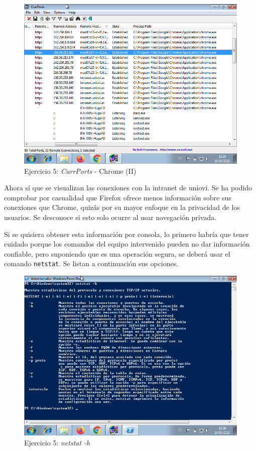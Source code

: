 \documentclass[11pt]{article}
\begin{document}
\begin{figure}[H]
    \caption{Ejercicio 5: \textit{CurrPorts} - Chrome (II)}
  \centering
    \includegraphics[scale=0.7]{p05/e5-5.png}
\end{figure}

Ahora sí que se visualizan las conexiones con la intranet de uniovi. Se ha podido comprobar por casualidad que Firefox ofrece menos información sobre sus conexiones que Chrome, quizás por su mayor enfoque en la privacidad de los usuarios. Se desconoce si esto solo ocurre al usar navegación privada.

Si se quisiera obtener esta información por consola, lo primero habría que tener cuidado porque los comandos del equipo intervenido pueden no dar información confiable, pero suponiendo que es una operación segura, se deberá usar el comando \verb|netstat|. Se listan a continuación sus opciones.

\begin{figure}[H]
    \caption{Ejercicio 5: \textit{netstat -h}}
  \centering
    \includegraphics[scale=0.7]{p05/e5-6.png}
\end{figure}
\end{document}
